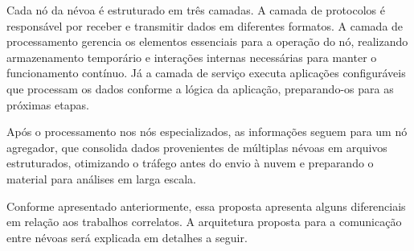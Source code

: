Cada nó da névoa é estruturado em três camadas. A camada de protocolos é responsável por receber e transmitir dados em diferentes formatos. A camada de processamento gerencia os elementos essenciais para a operação do nó, realizando armazenamento temporário e interações internas necessárias para manter o funcionamento contínuo. Já a camada de serviço executa aplicações configuráveis que processam os dados conforme a lógica da aplicação, preparando-os para as próximas etapas.

Após o processamento nos nós especializados, as informações seguem para um nó agregador, que consolida dados provenientes de múltiplas névoas em arquivos estruturados, otimizando o tráfego antes do envio à nuvem e preparando o material para análises em larga escala.

Conforme apresentado anteriormente, essa proposta apresenta alguns diferenciais em relação aos trabalhos correlatos. A arquitetura proposta para a comunicação entre névoas será explicada em detalhes a seguir.
